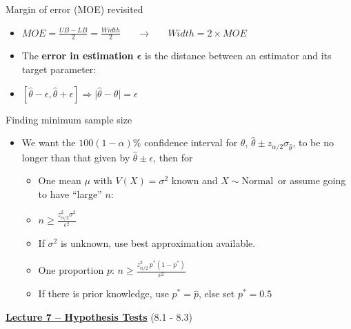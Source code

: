 \documentclass{article}
\newcommand{\bu}[1]{\textbf{\ul{#1}}}				%
\newcommand{\follow}[1]{\sim \text{#1}\,}		%
\begin{document}
Margin of error (MOE) revisited
\begin{itemize}
    \item $MOE = \frac{UB - LB}{2} = \frac{Width}{2} \hspace{20pt} \rightarrow \hspace{20pt} Width = 2 \times MOE$
    \item The \textbf{error in estimation} $\boldsymbol{\epsilon}$ is the distance between an estimator and its target parameter:
    \item[] $[\hat{\theta} - \epsilon, \hat{\theta} + \epsilon] \Longrightarrow \lvert \hat{\theta} - \theta \rvert = \epsilon$
\end{itemize}\bigskip

Finding minimum sample size
\begin{itemize}
    \item We want the $100 (1 - \alpha)\%$ confidence interval for $\theta$, $\hat{\theta} \pm z_{\alpha / 2} \sigma_{\hat{\theta}}$, to be no longer than that given by $\hat{\theta} \pm \epsilon$, then for
    \begin{itemize}
        \item One mean $\mu$ with $V(X) = \sigma^2$ known and $X \follow {Normal}$ or assume going to have ``large'' $n$:
        \item[] $\displaystyle n \ge \frac{z_{\alpha / 2}^2 \sigma^2}{\epsilon^2}$
        \item[] If $\sigma^2$ is unknown, use best approximation available.
        \item One proportion $p$: $\displaystyle n \ge \frac{z_{\alpha / 2}^2 \, p^* (1 - p^*)}{\epsilon^2}$
        \item[] If there is prior knowledge, use $p^* = \hat{p}$, else set $p^* = 0.5$
    \end{itemize}
\end{itemize}

\newpage

{\large \bu{Lecture 7 -- Hypothesis Tests}} (8.1 - 8.3)\bigskip
\end{document}

